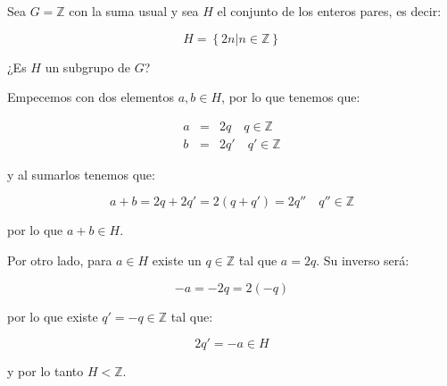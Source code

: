         \begin{ejemplo}
            Sea $G = \mathbb{Z}$ con la suma usual y sea $H$ el conjunto de los enteros pares, es decir:

            \begin{equation*}
                H = \left\{ 2n | n \in \mathbb{Z} \right\}
            \end{equation*}

            ¿Es $H$ un subgrupo de $G$?

            Empecemos con dos elementos $a, b \in H$, por lo que tenemos que:

            \begin{eqnarray*}
                a & = & 2 q \quad q \in \mathbb{Z} \\
                b & = & 2 q' \quad q' \in \mathbb{Z}
            \end{eqnarray*}

            y al sumarlos tenemos que:

            \begin{equation*}
                a + b = 2q + 2q' = 2(q + q') = 2q'' \quad q'' \in \mathbb{Z}
            \end{equation*}

            por lo que $a + b \in H$.

            Por otro lado, para $a \in H$ existe un $q \in \mathbb{Z}$ tal que $a = 2q$.
            Su inverso será:

            \begin{equation*}
                -a = -2 q = 2(-q)
            \end{equation*}

            por lo que existe $q' = -q \in \mathbb{Z}$ tal que:

            \begin{equation*}
                2 q' = -a \in H
            \end{equation*}

            y por lo tanto $H < \mathbb{Z}$.
        \end{ejemplo}

